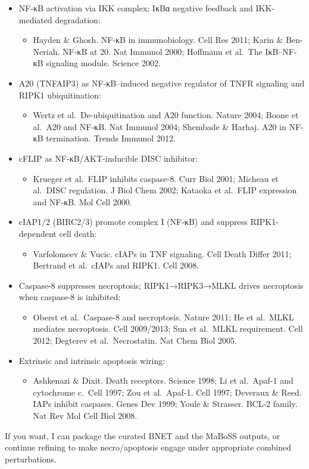 \begin{itemize}
\tightlist
\item
  NF-κB activation via IKK complex; IκBα negative feedback and
  IKK-mediated degradation:

  \begin{itemize}
  \tightlist
  \item
    Hayden \& Ghosh. NF-κB in immunobiology. Cell Res 2011; Karin \&
    Ben-Neriah. NF-κB at 20. Nat Immunol 2000; Hoffmann et al.~The
    IκB--NF-κB signaling module. Science 2002.
  \end{itemize}
\item
  A20 (TNFAIP3) as NF-κB--induced negative regulator of TNFR signaling
  and RIPK1 ubiquitination:

  \begin{itemize}
  \tightlist
  \item
    Wertz et al.~De-ubiquitination and A20 function. Nature 2004; Boone
    et al.~A20 and NF-κB. Nat Immunol 2004; Shembade \& Harhaj. A20 in
    NF-κB termination. Trends Immunol 2012.
  \end{itemize}
\item
  cFLIP as NF-κB/AKT-inducible DISC inhibitor:

  \begin{itemize}
  \tightlist
  \item
    Krueger et al.~FLIP inhibits caspase-8. Curr Biol 2001; Micheau et
    al.~DISC regulation. J Biol Chem 2002; Kataoka et al.~FLIP
    expression and NF-κB. Mol Cell 2000.
  \end{itemize}
\item
  cIAP1/2 (BIRC2/3) promote complex I (NF-κB) and suppress
  RIPK1-dependent cell death:

  \begin{itemize}
  \tightlist
  \item
    Varfolomeev \& Vucic. cIAPs in TNF signaling. Cell Death Differ
    2011; Bertrand et al.~cIAPs and RIPK1. Cell 2008.
  \end{itemize}
\item
  Caspase-8 suppresses necroptosis; RIPK1→RIPK3→MLKL drives necroptosis
  when caspase-8 is inhibited:

  \begin{itemize}
  \tightlist
  \item
    Oberst et al.~Caspase-8 and necroptosis. Nature 2011; He et al.~MLKL
    mediates necroptosis. Cell 2009/2013; Sun et al.~MLKL requirement.
    Cell 2012; Degterev et al.~Necrostatin. Nat Chem Biol 2005.
  \end{itemize}
\item
  Extrinsic and intrinsic apoptosis wiring:

  \begin{itemize}
  \tightlist
  \item
    Ashkenazi \& Dixit. Death receptors. Science 1998; Li et al.~Apaf-1
    and cytochrome c.~Cell 1997; Zou et al.~Apaf-1. Cell 1997; Deveraux
    \& Reed. IAPs inhibit caspases. Genes Dev 1999; Youle \& Strasser.
    BCL-2 family. Nat Rev Mol Cell Biol 2008.
  \end{itemize}
\end{itemize}

If you want, I can package the curated BNET and the MaBoSS outputs, or
continue refining to make necro/apoptosis engage under appropriate
combined perturbations.
